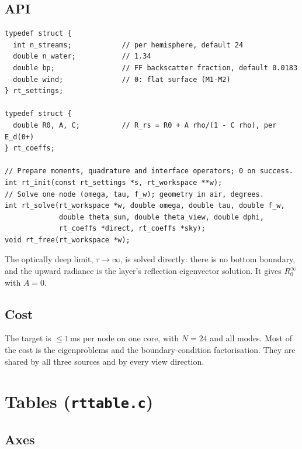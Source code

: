 \documentclass[11pt]{article}
\numberwithin{equation}{section}
\newcommand{\code}[1]{\texttt{#1}}
\begin{document}
\subsection{API}

\begin{verbatim}
typedef struct {
  int n_streams;            // per hemisphere, default 24
  double n_water;           // 1.34
  double bp;                // FF backscatter fraction, default 0.0183
  double wind;              // 0: flat surface (M1-M2)
} rt_settings;

typedef struct {
  double R0, A, C;          // R_rs = R0 + A rho/(1 - C rho), per E_d(0+)
} rt_coeffs;

// Prepare moments, quadrature and interface operators; 0 on success.
int rt_init(const rt_settings *s, rt_workspace **w);
// Solve one node (omega, tau, f_w); geometry in air, degrees.
int rt_solve(rt_workspace *w, double omega, double tau, double f_w,
             double theta_sun, double theta_view, double dphi,
             rt_coeffs *direct, rt_coeffs *sky);
void rt_free(rt_workspace *w);
\end{verbatim}
The optically deep limit, $\tau\to\infty$, is solved directly: there is no bottom boundary,
and the upward radiance is the layer's reflection eigenvector solution. It gives $R_0^\infty$
with $A = 0$.

\subsection{Cost}

The target is $\le 1$\,ms per node on one core, with $N=24$ and all modes. Most of the cost
is the eigenproblems and the boundary-condition factorisation. They are shared by all three
sources and by every view direction.

\section{Tables (\code{rttable.c})}\label{sec:table}

\subsection{Axes}
\end{document}
